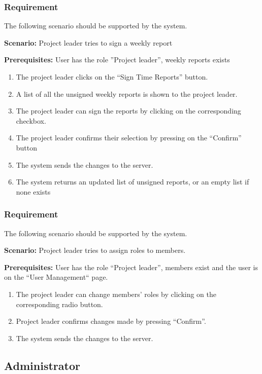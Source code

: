 \documentclass{article}
\begin{document}
\subsubsection{Requirement}
The following scenario should be supported by the system.

\textbf{Scenario:} Project leader tries to sign a weekly report

\textbf{Prerequisites:} User has the role ”Project leader”, weekly reports exists

\begin{enumerate}
    \item The project leader clicks on the “Sign Time Reports” button.
    \item A list of all the unsigned weekly reports is shown to the project leader.
    \item The project leader can sign the reports by clicking on the corresponding checkbox.
    \item The project leader confirms their selection by pressing on the “Confirm” button
    \item The system sends the changes to the server.
    \item The system returns an updated list of unsigned reports, or an empty list if none exists
\end{enumerate}

\subsubsection{Requirement}
The following scenario should be supported by the system.

\textbf{Scenario:} Project leader tries to assign roles to members.

\textbf{Prerequisites:} User has the role “Project leader”, members exist and the user is on the “User Management“ page.

\begin{enumerate}
    \item The project leader can change members' roles by clicking on the corresponding radio button.
    \item Project leader confirms changes made by pressing “Confirm”.
    \item The system sends the changes to the server.
    
\end{enumerate}


\subsection{Administrator}
\end{document}
